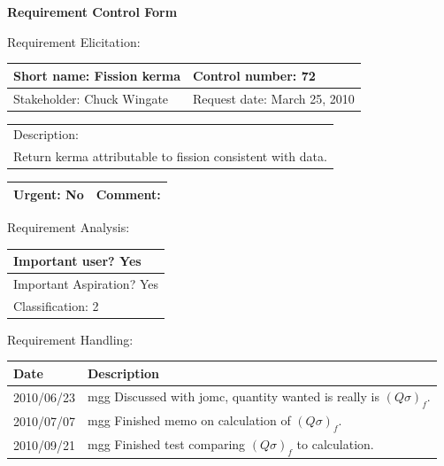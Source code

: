 \begin{center}\Large\bf
Requirement Control Form
\end{center}
\vspace{24pt}

Requirement Elicitation:

\begin{tabular}{|p{211pt}|p{211pt}|} \hline
Short name: Fission kerma & Control number: 72\\ \hline
Stakeholder: Chuck Wingate & Request date: March 25, 2010\\
\end{tabular}
\begin{tabular}{|p{433pt}|} \hline
Description: \\ 
Return kerma attributable to fission consistent with data.
\\ \hline
\end{tabular} 
\begin{tabular}{|p{211pt}|p{211pt}|} \hline
Urgent: No & Comment:
\\ \hline
\end{tabular}

\vspace{24pt}

Requirement Analysis:

\begin{tabular}{|p{433pt}|} \hline
Important user? Yes \\ \hline
Important Aspiration? Yes \\ \hline
Classification: 2 \\ \hline
\end{tabular}
\vspace{24pt}

Requirement Handling:

\begin{tabular}{|p{72pt}|p{351pt}|} \hline
Date & Description \\ \hline
2010/06/23 & mgg Discussed with jomc, quantity wanted is really is $(Q
\sigma)_f$. \\ \hline 
2010/07/07 & mgg Finished memo on calculation of $(Q\sigma)_f$. \\
\hline
2010/09/21 & mgg Finished test comparing $(Q\sigma)_f$ to calculation. \\ \hline
\end{tabular}
